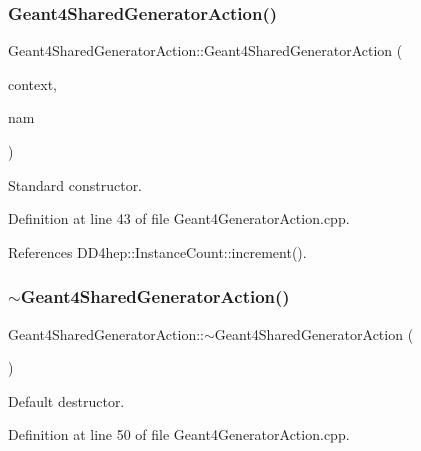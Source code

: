 \subsubsection{\texorpdfstring{Geant4\+Shared\+Generator\+Action()}{Geant4SharedGeneratorAction()}}
{\footnotesize\ttfamily Geant4\+Shared\+Generator\+Action\+::\+Geant4\+Shared\+Generator\+Action (\begin{DoxyParamCaption}\item[{\hyperlink{class_d_d4hep_1_1_simulation_1_1_geant4_context}{Geant4\+Context} $\ast$}]{context,  }\item[{const std\+::string \&}]{nam }\end{DoxyParamCaption})}



Standard constructor. 



Definition at line 43 of file Geant4\+Generator\+Action.\+cpp.



References D\+D4hep\+::\+Instance\+Count\+::increment().

\hypertarget{class_d_d4hep_1_1_simulation_1_1_geant4_shared_generator_action_a56bf96138bef68d15352b9f6e2a5aa00}{}\label{class_d_d4hep_1_1_simulation_1_1_geant4_shared_generator_action_a56bf96138bef68d15352b9f6e2a5aa00} 
\subsubsection{\texorpdfstring{$\sim$\+Geant4\+Shared\+Generator\+Action()}{~Geant4SharedGeneratorAction()}}
{\footnotesize\ttfamily Geant4\+Shared\+Generator\+Action\+::$\sim$\+Geant4\+Shared\+Generator\+Action (\begin{DoxyParamCaption}{ }\end{DoxyParamCaption})\hspace{0.3cm}{\ttfamily [virtual]}}



Default destructor. 



Definition at line 50 of file Geant4\+Generator\+Action.\+cpp.



